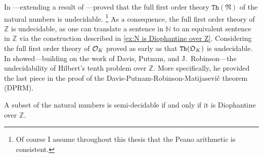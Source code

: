 In \citeyear{Rosser1936} \textcite{Rosser1936}---extending a result of
\textcite{Goedel1931}---proved that the full first order theory
\(\mathtt{Th}(\mathfrak{N})\) of the natural numbers is undecidable.%
\footnote{Of course I assume throughout this thesis that the Peano arithmetic
          is consistent.}
As a consequence, the full first order theory of \(ℤ\) is undecidable, as one
can translate a sentence in \(ℕ\) to an equivalent sentence in \(ℤ\) via the
construction described in \cref{ex:N is Diophantine over Z}. Considering the
full first order theory of \(\mathcal{O}_{K}\) \textcite{Robinson1959} proved as early
as \citeyear{Robinson1959} that \(\mathtt{Th}(\mathfrak{O}_{K})\) is undecidable. In
\citeyear{Matijasevic1970} \textcite{Matijasevic1970} showed---building on the
work of Davis, Putnam, and J.~Robinson---the undecidability of Hilbert's tenth
problem over \(ℤ\). More specifically, he provided the last piece in the proof
of the Davis-Putnam-Robinson-Matijasevič theorem (\textsc{DPRM}).

\begin{thm}\label{thm:DPRM}
  A subset of the natural numbers is semi-decidable if and only if it is
  Diophantine over \(ℤ\).
\end{thm}

